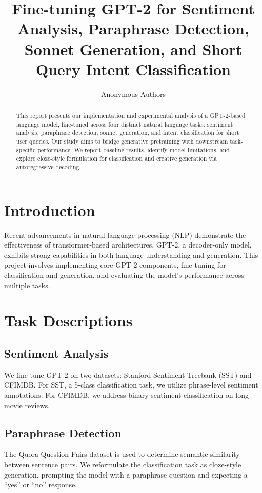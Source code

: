\documentclass{article}
\title{Fine-tuning GPT-2 for Sentiment Analysis, Paraphrase Detection, Sonnet Generation, and Short Query Intent Classification}
\author{Anonymous Authors}
\begin{document}
\maketitle

\begin{abstract}
This report presents our implementation and experimental analysis of a GPT-2-based language model, fine-tuned across four distinct natural language tasks: sentiment analysis, paraphrase detection, sonnet generation, and intent classification for short user queries. Our study aims to bridge generative pretraining with downstream task-specific performance. We report baseline results, identify model limitations, and explore cloze-style formulation for classification and creative generation via autoregressive decoding.
\end{abstract}

\section{Introduction}
Recent advancements in natural language processing (NLP) demonstrate the effectiveness of transformer-based architectures. GPT-2, a decoder-only model, exhibits strong capabilities in both language understanding and generation. This project involves implementing core GPT-2 components, fine-tuning for classification and generation, and evaluating the model's performance across multiple tasks.

\section{Task Descriptions}
\subsection{Sentiment Analysis}
We fine-tune GPT-2 on two datasets: Stanford Sentiment Treebank (SST) and CFIMDB. For SST, a 5-class classification task, we utilize phrase-level sentiment annotations. For CFIMDB, we address binary sentiment classification on long movie reviews.

\subsection{Paraphrase Detection}
The Quora Question Pairs dataset is used to determine semantic similarity between sentence pairs. We reformulate the classification task as cloze-style generation, prompting the model with a paraphrase question and expecting a ``yes'' or ``no'' response.
\end{document}
